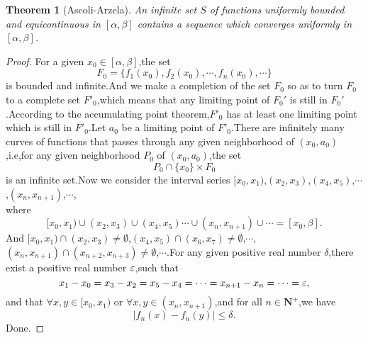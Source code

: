 \documentclass[a4paper, 12pt]{article} %
\newtheorem*{adtheorem}{Theorem}
\newenvironment{theorem}
{\bigskip\begin{mdframed}[backgroundcolor=gray!40,rightline=false,leftline=false,topline=false,bottomline=false]\begin{adtheorem}}
    {\end{adtheorem}\end{mdframed}\bigskip}
\begin{document}
\begin{CJK}{UTF8}{gkai}
  \begin{theorem}[Ascoli-Arzela]
    An infinite set $S$ of functions uniformly bounded and
    equicontinuous in $[\alpha,\beta]$ contains a sequence which
    converges uniformly in $[\alpha,\beta]$.
  \end{theorem}
  \begin{proof}
    For a given $x_0\in [\alpha,\beta]$,the set
$$
F_{0}=\{f_1(x_0),f_2(x_0),\cdots,f_n(x_0),\cdots\}
$$
is bounded and infinite.And we make a completion of the set $F_{0}$ so
as to turn $F_{0}$ to a complete set $F'_{0}$,which means that any
limiting point of $F_0'$ is still in $F_0'$.According to the
accumulating point theorem,$F'_{0}$ has at least one limiting point
which is still in $F'_{0}$.Let $a_0$ be a limiting point of
$F'_{0}$.There are infinitely many curves of functions that passes
through any given neighborhood of $(x_{0},a_0)$,i.e,for any given
neighborhood $P_0$ of $(x_{0},a_0)$,the set
$$
P_0\cap \{x_0\}\times F_0
$$
is an infinite set.Now we consider the interval series
$[x_0,x_1)$,$(x_2,x_3)$,$(x_4,x_5)$,$\cdots$,$(x_n,x_{n+1})$,$\cdots$,\\where
$$
[x_0,x_1)\cup (x_2,x_3)\cup (x_4,x_5)\cdots\cup (x_n,x_{n+1})\cup\cdots=[x_0,\beta].
$$
And $[x_0,x_1)\cap (x_2,x_3)\neq\emptyset$,$(x_4,x_5)\cap
(x_6,x_7)\neq\emptyset$,$\cdots$,$(x_n,x_{n+1})\cap
(x_{n+2},x_{n+3})\neq\emptyset$,$\cdots$.For any given positive real
number $\delta$,there exist a positive real number $\varepsilon$,such that
$$
x_1-x_0=x_3-x_2=x_5-x_4=\cdots=x_{n+1}-x_n=\cdots=\varepsilon,
$$
and that $\forall x,y\in [x_0,x_1)$ or $\forall x,y\in
(x_n,x_{n+1})$,and for all $n\in\mathbf{N}^{+}$,we have 
$$
|f_{n}(x)-f_{n}(y)|\leq \delta.
$$
Done.
\end{proof}

  

  

  
\end{CJK}
\end{document}
